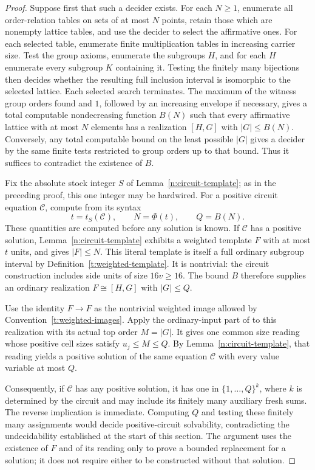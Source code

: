 \begin{proof}
Suppose first that such a decider exists.  For each $N\ge1$, enumerate
all order-relation tables on sets of at most $N$ points, retain those
which are nonempty lattice tables, and use the decider to select the
affirmative ones.  For each selected table, enumerate finite
multiplication tables in increasing carrier size.  Test the group
axioms, enumerate the subgroups $H$, and for each $H$ enumerate every
subgroup $K$ containing it.  Testing the finitely many bijections
then decides whether the resulting full inclusion interval is
isomorphic to the selected lattice.  Each selected search terminates.
The maximum of the witness group orders found and $1$, followed by
an increasing envelope if necessary, gives a total computable
nondecreasing function $B(N)$ such that every affirmative lattice
with at most $N$ elements has a realization $[H,G]$ with $|G|\le B(N)$.
Conversely, any total computable bound on the least possible $|G|$
gives a decider by the same finite tests restricted to group orders
up to that bound.  Thus it suffices to contradict the existence of $B$.

Fix the absolute stock integer $S$ of Lemma~\ref{n:circuit-template}; as
in the preceding proof, this one integer may be hardwired.  For a
positive circuit equation $\mathcal C$, compute from its syntax
\[
 t=t_S(\mathcal C),\qquad N=\Phi(t),\qquad Q=B(N).
\]
These quantities are computed before any solution is known.
If $\mathcal C$ has a positive solution, Lemma~\ref{n:circuit-template}
exhibits a weighted template $F$ with at most $t$ units, and
 gives $|F|\le N$.  This literal template is
itself a full ordinary subgroup interval by Definition~\ref{t:weighted-template}.
It is nontrivial: the circuit construction includes side units of
size $16v\ge16$.  The bound $B$ therefore supplies an ordinary
realization $F\cong[H,G]$ with $|G|\le Q$.

Use the identity $F\to F$ as the nontrivial weighted image allowed
by Convention~\ref{t:weighted-images}.  Apply the ordinary-input part of
 to this realization with its actual
top order $M=|G|$.  It gives one common size reading whose positive
cell sizes satisfy $u_j\le M\le Q$.  By Lemma~\ref{n:circuit-template},
that reading yields a positive solution of the same equation
$\mathcal C$ with every value variable at most $Q$.

Consequently, if $\mathcal C$ has any positive solution, it has one
in $\{1,\ldots,Q\}^{k}$, where $k$ is determined by the circuit and
may include its finitely many auxiliary fresh sums.  The reverse
implication is immediate.  Computing $Q$ and testing these finitely
many assignments would decide positive-circuit solvability,
contradicting the undecidability established at the start of this
section.  The argument uses the existence of $F$ and of its reading
only to prove a bounded replacement for a solution; it does not
require either to be constructed without that solution.
\end{proof}
